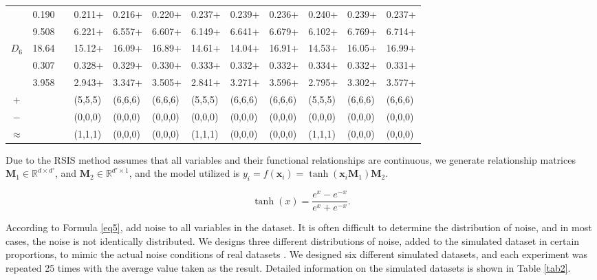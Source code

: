 \documentclass[final,3p,times]{elsarticle}
\begin{document}
\begin{table}[t!]
\begin{tabularx}{\textwidth}{cccXXXXXXXXX}
    & 0.190 &  & 0.211+ & 0.216+ & 0.220+ & 0.237+ & 0.239+ & 0.236+ & 0.240+ & 0.239+ & 0.237+ \\
    & 9.508 &  & 6.221+ & 6.557+ & 6.607+ & 6.149+ & 6.641+ & 6.679+ & 6.102+ & 6.769+ & 6.714+ \\
  \hline
  \multirow{3}{*}{$D_6$} & 18.64 &  & 15.12+ & 16.09+ & 16.89+ & 14.61+ & 14.04+ & 16.91+ & 14.53+ & 16.05+ & 16.99+ \\
    & 0.307 &  & 0.328+ & 0.329+ & 0.330+ & 0.333+ & 0.332+ & 0.332+ & 0.334+ & 0.332+ & 0.331+ \\
    & 3.958 &  & 2.943+ & 3.347+ & 3.505+ & 2.841+ & 3.271+ & 3.596+ & 2.795+ & 3.302+ & 3.577+ \\
  \hline
  $+$ &  &  & (5,5,5) & (6,6,6) & (6,6,6) & (5,5,5) & (6,6,6) & (6,6,6) & (5,5,5) & (6,6,6) & (6,6,6) \\
  $-$ &  &  & (0,0,0) & (0,0,0) & (0,0,0) & (0,0,0) & (0,0,0) & (0,0,0) & (0,0,0) & (0,0,0) & (0,0,0) \\
  $\approx$ &  &  & (1,1,1) & (0,0,0) & (0,0,0) & (1,1,1) & (0,0,0) & (0,0,0) & (1,1,1) & (0,0,0) & (0,0,0) \\

  \bottomrule
  \end{tabularx}
\end{table}





Due to the RSIS method assumes that all variables and their 
functional relationships are continuous, we generate relationship 
matrices $\boldsymbol{M}_1\in\mathbb{R}^{d\times{d'}}$, and 
$\boldsymbol{M}_2\in\mathbb{R}^{d'\times{1}}$, and the model 
utilized is $y_i = f(\boldsymbol{x}_i) = \tanh(\boldsymbol{x}_i 
\boldsymbol{M}_1)\boldsymbol{M}_2$. 

\begin{equation}
\label{eq18}
\tanh(x) = \frac{e^x - e^{-x}}{e^x + e^{-x}}.
\end{equation}

According to Formula \eqref{eq5}, add noise to all variables in 
the dataset. It is often difficult to determine the distribution 
of noise, and in most cases, the noise is not identically 
distributed. We designs three different distributions of noise, 
added to the simulated dataset in certain proportions, to mimic 
the actual noise conditions of real datasets \cite{bib82}. We designed 
six different simulated datasets, and each experiment was 
repeated 25 times with the average value taken as the result. 
Detailed information on the simulated datasets is shown in 
Table \ref{tab2}.
\end{document}
